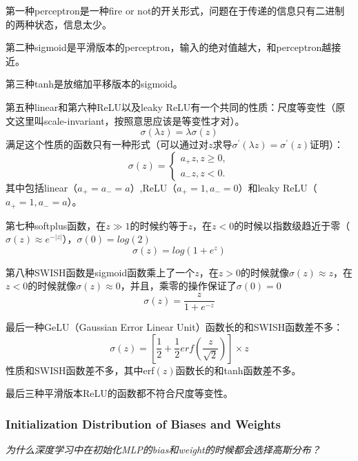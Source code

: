 第一种perceptron是一种fire or not的开关形式，问题在于传递的信息只有二进制的两种状态，信息太少。

第二种sigmoid是平滑版本的perceptron，输入的绝对值越大，和perceptron越接近。

第三种tanh是放缩加平移版本的sigmoid。

第五种linear和第六种ReLU以及leaky ReLU有一个共同的性质：尺度等变性（原文这里叫scale-invariant，按照意思应该是等变性才对）。
\begin{equation}
    \sigma(\lambda z)=\lambda \sigma(z)
\end{equation}
满足这个性质的函数只有一种形式（可以通过对$z$求导$\sigma^{'}(\lambda z)=\sigma^{'}(z)$证明）：
\begin{equation}
    \sigma(z)=\left\{
        \begin{aligned}
            a_{+}z, z\geq 0,\\
            a_{-}z, z< 0.
        \end{aligned}
    \right.
\end{equation}
其中包括linear（$a_{+}=a_{-}=a$）,ReLU（$a_{+}=1, a_{-}=0$）和leaky ReLU（$a_{+}=1, a_{-}=a$）。

第七种softplus函数，在$z\gg 1$的时候约等于$z$，在$z<0$的时候以指数级趋近于零（$\sigma(z)\approx e^{-|z|}$），$\sigma(0)=log(2)$
\begin{equation}
    \sigma(z)=log(1+e^z)
\end{equation}

第八种SWISH函数是sigmoid函数乘上了一个$z$，在$z>0$的时候就像$\sigma(z)\approx z$，在$z<0$的时候就像$\sigma(z)\approx 0$，并且，乘零的操作保证了$\sigma(0)=0$
\begin{equation}
    \sigma(z)=\frac{z}{1+e^{-z}}
\end{equation}

最后一种GeLU（Gaussian Error Linear Unit）函数长的和SWISH函数差不多：
\begin{equation}
    \sigma(z)=[\frac{1}{2}+\frac{1}{2}erf(\frac{z}{\sqrt{2}})]\times z
\end{equation}
性质和SWISH函数差不多，其中erf$(z)$函数长的和tanh函数差不多。

最后三种平滑版本ReLU的函数都不符合尺度等变性。

\subsubsection{Initialization Distribution of Biases and Weights}
\emph{为什么深度学习中在初始化MLP的bias和weight的时候都会选择高斯分布？}

